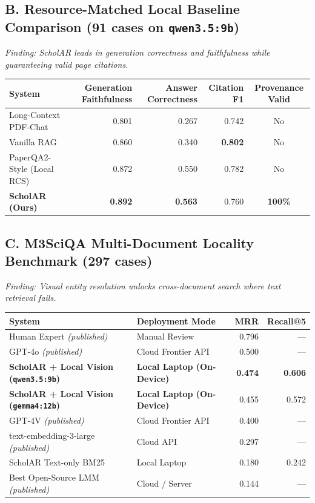 \documentclass[10pt,a4paper]{article}
\begin{document}
\subsection{B. Resource-Matched Local Baseline Comparison (91 cases on \texttt{qwen3.5:9b})}
\textit{Finding: ScholAR leads in generation correctness and faithfulness while guaranteeing valid page citations.}

\begin{table}[h!]
\centering
\small
\begin{tabularx}{\textwidth}{X r r r c}
\toprule
\textbf{System} & \textbf{Generation Faithfulness} & \textbf{Answer Correctness} & \textbf{Citation F1} & \textbf{Provenance Valid} \\
\midrule
Long-Context PDF-Chat & 0.801 & 0.267 & 0.742 & No \\
Vanilla RAG & 0.860 & 0.340 & \textbf{0.802} & No \\
PaperQA2-Style (Local RCS) & 0.872 & 0.550 & 0.782 & No \\
\textbf{ScholAR (Ours)} & \textbf{0.892} & \textbf{0.563} & 0.760 & \textbf{100\%} \\
\bottomrule
\end{tabularx}
\end{table}

\newpage

\subsection{C. M3SciQA Multi-Document Locality Benchmark (297 cases)}
\textit{Finding: Visual entity resolution unlocks cross-document search where text retrieval fails.}

\begin{table}[h!]
\centering
\small
\begin{tabularx}{0.85\textwidth}{X l r r}
\toprule
\textbf{System} & \textbf{Deployment Mode} & \textbf{MRR} & \textbf{Recall@5} \\
\midrule
Human Expert \textit{(published)} & Manual Review & 0.796 & — \\
GPT-4o \textit{(published)} & Cloud Frontier API & 0.500 & — \\
\textbf{ScholAR + Local Vision (\texttt{qwen3.5:9b})} & \textbf{Local Laptop (On-Device)} & \textbf{0.474} & \textbf{0.606} \\
\textbf{ScholAR + Local Vision (\texttt{gemma4:12b})} & \textbf{Local Laptop (On-Device)} & 0.455 & 0.572 \\
GPT-4V \textit{(published)} & Cloud Frontier API & 0.400 & — \\
text-embedding-3-large \textit{(published)} & Cloud API & 0.297 & — \\
ScholAR Text-only BM25 & Local Laptop & 0.180 & 0.242 \\
Best Open-Source LMM \textit{(published)} & Cloud / Server & 0.144 & — \\
\bottomrule
\end{tabularx}
\end{table}
\end{document}
